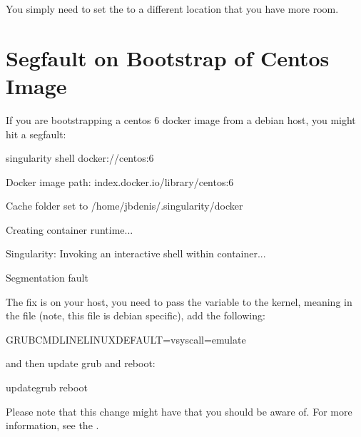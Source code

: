 \documentclass[letterpaper,10pt,english]{sphinxmanual}
\begin{document}
You simply need to set the  to a different location that you have more
room.


\section{Segfault on Bootstrap of Centos Image}
\label{\detokenize{troubleshooting:segfault-on-bootstrap-of-centos-image}}
If you are bootstrapping a centos 6 docker image from a debian host,
you might hit a segfault:

%
\begin{sphinxVerbatim}[commandchars=\\\{\}]
\PYGZdl{} singularity shell docker://centos:6

Docker image path: index.docker.io/library/centos:6

Cache folder set to /home/jbdenis/.singularity/docker

Creating container runtime...

Singularity: Invoking an interactive shell within container...


Segmentation fault
\end{sphinxVerbatim}

The fix is on your host, you need to pass the variable  to the kernel,
meaning in the file  (note, this file is debian specific), add the
following:

%
\begin{sphinxVerbatim}[commandchars=\\\{\}]
GRUB\PYGZus{}CMDLINE\PYGZus{}LINUX\PYGZus{}DEFAULT=\PYGZdq{}vsyscall=emulate\PYGZdq{}
\end{sphinxVerbatim}

and then update grub and reboot:

%
\begin{sphinxVerbatim}[commandchars=\\\{\}]
update\PYGZhy{}grub \PYGZam{}\PYGZam{} reboot
\end{sphinxVerbatim}

Please note that this change might have  that
you should be aware of. For more information, see the .
\end{document}
